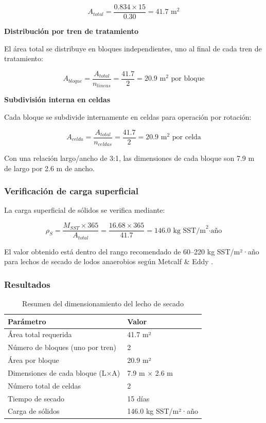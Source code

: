 \documentclass[12pt,a4paper]{article}
\begin{document}
\begin{equation}
A_{total} = \frac{0.834 \times 15}{0.30} = 41.7 \text{ m}^2
\end{equation}

\textbf{Distribución por tren de tratamiento}

El área total se distribuye en bloques independientes, uno al final de cada tren de tratamiento:

\begin{equation}
A_{bloque} = \frac{A_{total}}{n_{lineas}} = \frac{41.7}{2} = 20.9 \text{ m}^2 \text{ por bloque}
\end{equation}

\textbf{Subdivisión interna en celdas}

Cada bloque se subdivide internamente en celdas para operación por rotación:

\begin{equation}
A_{celda} = \frac{A_{total}}{n_{celdas}} = \frac{41.7}{2} = 20.9 \text{ m}^2 \text{ por celda}
\end{equation}

Con una relación largo/ancho de 3:1, las dimensiones de cada bloque son 7.9 m de largo por 2.6 m de ancho.

\subsubsection{Verificación de carga superficial}

La carga superficial de sólidos se verifica mediante:

\begin{equation}
\rho_S = \frac{M_{SST} \times 365}{A_{total}} = \frac{16.68 \times 365}{41.7} = 146.0 \text{ kg SST/m}^2\text{·año}
\end{equation}

El valor obtenido está dentro del rango recomendado de 60--220 kg SST/m²·año para lechos de secado de lodos anaerobios según Metcalf \& Eddy \cite{metcalf2014}.

\subsubsection{Resultados}

\begin{table}[H]
\centering
\caption{Resumen del dimensionamiento del lecho de secado}
\begin{tabular}{ll}
\toprule
Parámetro & Valor \\
\midrule
Área total requerida & 41.7 m² \\
Número de bloques (uno por tren) & 2 \\
Área por bloque & 20.9 m² \\
Dimensiones de cada bloque (L×A) & 7.9 m × 2.6 m \\
Número total de celdas & 2 \\
Tiempo de secado & 15 días \\
Carga de sólidos & 146.0 kg SST/m²·año \\
\bottomrule
\end{tabular}
\end{table}
\end{document}
